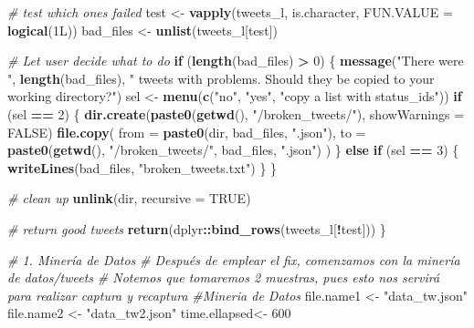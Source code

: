 \documentclass[
]{article}
\newenvironment{Shaded}{\begin{snugshade}}{\end{snugshade}}
\newcommand{\CommentTok}[1]{\textcolor[rgb]{0.56,0.35,0.01}{\textit{#1}}}
\newcommand{\ControlFlowTok}[1]{\textcolor[rgb]{0.13,0.29,0.53}{\textbf{#1}}}
\newcommand{\DataTypeTok}[1]{\textcolor[rgb]{0.13,0.29,0.53}{#1}}
\newcommand{\DecValTok}[1]{\textcolor[rgb]{0.00,0.00,0.81}{#1}}
\newcommand{\KeywordTok}[1]{\textcolor[rgb]{0.13,0.29,0.53}{\textbf{#1}}}
\newcommand{\NormalTok}[1]{#1}
\newcommand{\OperatorTok}[1]{\textcolor[rgb]{0.81,0.36,0.00}{\textbf{#1}}}
\newcommand{\OtherTok}[1]{\textcolor[rgb]{0.56,0.35,0.01}{#1}}
\newcommand{\StringTok}[1]{\textcolor[rgb]{0.31,0.60,0.02}{#1}}
\begin{document}
\begin{Shaded}
\begin{Highlighting}[]
{  \CommentTok{# test which ones failed}
\NormalTok{  test <-}\StringTok{ }\KeywordTok{vapply}\NormalTok{(tweets_l, is.character, }\DataTypeTok{FUN.VALUE =} \KeywordTok{logical}\NormalTok{(1L))}
\NormalTok{  bad_files <-}\StringTok{ }\KeywordTok{unlist}\NormalTok{(tweets_l[test])}
  
  \CommentTok{# Let user decide what to do}
  \ControlFlowTok{if}\NormalTok{ (}\KeywordTok{length}\NormalTok{(bad_files) }\OperatorTok{>}\StringTok{ }\DecValTok{0}\NormalTok{) \{}
    \KeywordTok{message}\NormalTok{(}\StringTok{"There were "}\NormalTok{, }\KeywordTok{length}\NormalTok{(bad_files),}
            \StringTok{" tweets with problems. Should they be copied to your working directory?"}\NormalTok{)}
\NormalTok{    sel <-}\StringTok{ }\KeywordTok{menu}\NormalTok{(}\KeywordTok{c}\NormalTok{(}\StringTok{"no"}\NormalTok{, }\StringTok{"yes"}\NormalTok{, }\StringTok{"copy a list with status_ids"}\NormalTok{))}
    \ControlFlowTok{if}\NormalTok{ (sel }\OperatorTok{==}\StringTok{ }\DecValTok{2}\NormalTok{) \{}
      \KeywordTok{dir.create}\NormalTok{(}\KeywordTok{paste0}\NormalTok{(}\KeywordTok{getwd}\NormalTok{(), }\StringTok{"/broken_tweets/"}\NormalTok{), }\DataTypeTok{showWarnings =} \OtherTok{FALSE}\NormalTok{)}
      \KeywordTok{file.copy}\NormalTok{(}
        \DataTypeTok{from =} \KeywordTok{paste0}\NormalTok{(dir, bad_files, }\StringTok{".json"}\NormalTok{),}
        \DataTypeTok{to =} \KeywordTok{paste0}\NormalTok{(}\KeywordTok{getwd}\NormalTok{(), }\StringTok{"/broken_tweets/"}\NormalTok{, bad_files, }\StringTok{".json"}\NormalTok{)}
\NormalTok{      )}
\NormalTok{    \} }\ControlFlowTok{else} \ControlFlowTok{if}\NormalTok{ (sel }\OperatorTok{==}\StringTok{ }\DecValTok{3}\NormalTok{) \{}
      \KeywordTok{writeLines}\NormalTok{(bad_files, }\StringTok{"broken_tweets.txt"}\NormalTok{)}
\NormalTok{    \}}
\NormalTok{  \}}
  
  \CommentTok{# clean up}
  \KeywordTok{unlink}\NormalTok{(dir, }\DataTypeTok{recursive =} \OtherTok{TRUE}\NormalTok{)}
  
  \CommentTok{# return good tweets}
  \KeywordTok{return}\NormalTok{(dplyr}\OperatorTok{::}\KeywordTok{bind_rows}\NormalTok{(tweets_l[}\OperatorTok{!}\NormalTok{test]))}
\NormalTok{\}}

\CommentTok{# 1. Minería de Datos}
\CommentTok{# Después de emplear el fix, comenzamos con la minería de datos/tweets}
\CommentTok{# Notemos que tomaremos 2 muestras, pues esto nos servirá para realizar captura y recaptura}
\CommentTok{#Mineria de Datos}
\NormalTok{file.name1 <-}\StringTok{ "data_tw.json"}
\NormalTok{file.name2 <-}\StringTok{ "data_tw2.json"}
\NormalTok{time.ellapsed<-}\StringTok{ }\DecValTok{600}

}
\end{Highlighting}
\end{Shaded}
\end{document}
